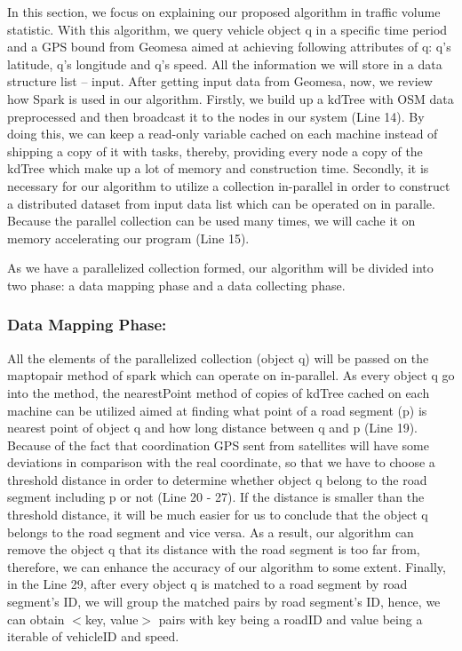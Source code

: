 \documentclass{acm_proc_article-sp}
\begin{document}
	\setlength{\parindent}{0.7cm} In this section, we focus on explaining our proposed algorithm in traffic volume statistic. With this algorithm, we query vehicle object q in a specific time period and a GPS bound from Geomesa aimed at achieving following attributes of q: q's latitude, q's longitude and q's speed. All the information we will store in a data structure list – input. After getting input data from Geomesa, now, we review how Spark is used in our algorithm. Firstly, we build up a kdTree with OSM data preprocessed and then broadcast it to the nodes in our system (Line 14). By doing this, we can keep a read-only variable cached on each machine instead of shipping a copy of it with tasks, thereby, providing every node a copy of the kdTree which make up a lot of memory and construction time. Secondly, it is necessary for our algorithm to utilize a collection in-parallel in order to construct a distributed dataset from input data list which can be operated on in paralle. Because the parallel collection can be used many times, we will cache it on memory accelerating our program (Line 15).
	
\setlength{\parindent}{0.7cm} As we have a parallelized collection formed, our algorithm will be divided into two phase: a data mapping phase and a data collecting phase. 

\subsubsection{Data Mapping Phase:} All the elements of the parallelized collection (object q) will be passed on the maptopair method of spark which can operate on in-parallel. As every object q go into the method, the nearestPoint method of copies of kdTree cached on each machine can be utilized aimed at finding what point of a road segment (p) is nearest point of object q and how long distance between q and p (Line 19). Because of the fact that coordination GPS sent from satellites will have some deviations in comparison with the real coordinate, so that we have to choose a threshold distance in order to determine whether object q belong to the road segment including p or not (Line 20 - 27). If the distance is smaller than the threshold distance, it will be much easier for us to conclude that the object q belongs to the road segment and vice versa. As a result, our algorithm can remove the object q that its distance with the road segment is too far from, therefore, we can enhance the accuracy of our algorithm to some extent. Finally, in the Line 29, after every object q is matched to a road segment by road segment's ID, we will group the matched pairs by road segment's ID, hence, we can obtain $<$key, value$>$ pairs with key being a roadID and value being a iterable of vehicleID and speed.
\end{document}
